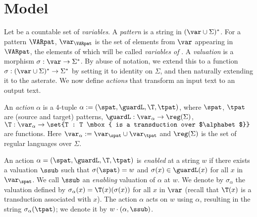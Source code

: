 
\section{Model}\label{sec:c03-model}

Let \var{} be a countable set of \emph{variables}. A \emph{pattern} is a string in $(\var \cup \Sigma)^*$. For a pattern $\VARpat$, $\var_\VARpat$ is the set of elements from $\var$ appearing in $\VARpat$, the elements of which will be called \emph{variables of \VARpat}. A \emph{valuation} is a morphism $\sigma : \var \to \Sigma^*$. By abuse of notation, we extend this to a function $\sigma : (\var \cup \Sigma)^* \to \Sigma^*$ by setting it to identity on $\Sigma$, and then naturally extending it to the asterate.  We now define \textit{actions} that transform an input text to an output text.

An \emph{action} $\alpha$ is a 4-tuple $ \alpha := (\spat, \guardL, \T, \tpat)$, where $\spat$, $\tpat$ are (source and target) patterns, $\guardL: \var_\alpha \to \reg(\Sigma)$, $\T :\var_\alpha \to \set{T : T \mbox{ is a transduction over $\alphabet$}}$ are functions. Here $\var_\alpha := \var_\spat \cup \var_\tpat$ and $\reg(\Sigma)$ is the set of regular languages over $\Sigma$.

An action $\alpha = (\spat, \guardL, \T, \tpat)$ is \emph{enabled} at a string $w$ if there exists a valuation $\ssub$ such that $\sigma(\spat) = w$ and $\sigma(x) \in \guardL(x)$ for all $x$ in  $\var_\spat$. We call $\ssub$ an \emph{enabling} valuation of $\alpha$ at $w$. We denote by $\sigma_\alpha$ the valuation defined by $\sigma_\alpha(x)=\T(x)(\sigma(x))$ for all $x$ in $\var$ (recall that $\T(x)$ is a transduction associated with $x$). The action $\alpha$ acts on $w$ using $\alpha$, resulting in the string $\sigma_\alpha(\tpat)$; we denote it by $w\cdot (\alpha, \ssub)$.

